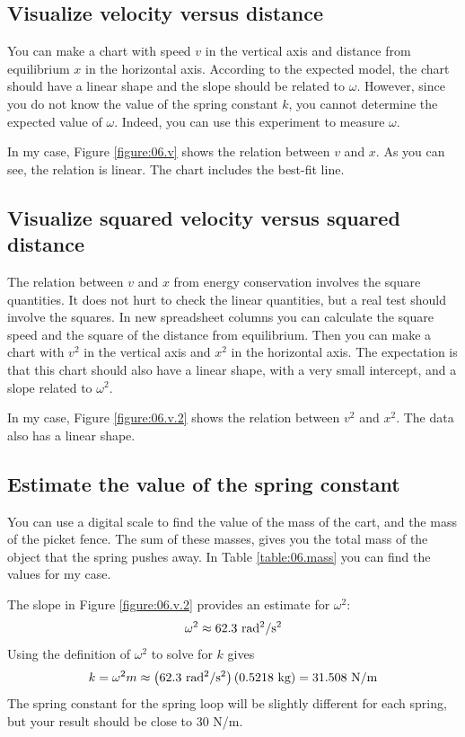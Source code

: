 \subsection{Visualize velocity versus distance}
%
You can make a chart with speed $v$ in the vertical axis and distance from equilibrium $x$ in the horizontal axis. According to the expected model, the chart should have a linear shape and the slope should be related to $\omega$. However, since you do not know the value of the spring constant $k$, you cannot determine the expected value of $\omega$. Indeed, you can use this experiment to measure $\omega$.

In my case, Figure \ref{figure:06.v} shows the relation between $v$ and $x$. As you can see, the relation is linear. The chart includes the best-fit line.
%
\subsection{Visualize squared velocity versus squared distance}
%
The relation between $v$ and $x$ from energy conservation involves the square quantities. It does not hurt to check the linear quantities, but a real test should involve the squares. In new spreadsheet columns you can calculate the square speed and the square of the distance from equilibrium. Then you can make a chart with $v^{2}$ in the vertical axis and $x^{2}$ in the horizontal axis. The expectation is that this chart should also have a linear shape, with a very small intercept, and a slope related to $\omega^{2}$.

In my case, Figure \ref{figure:06.v.2} shows the relation between $v^{2}$ and $x^{2}$. The data also has a linear shape.
%
\subsection{Estimate the value of the spring constant}
%
You can use a digital scale to find the value of the mass of the cart, and the mass of the picket fence. The sum of these masses, gives you the total mass of the object that the spring pushes away. In Table \ref{table:06.mass} you can find the values for my case.

The slope in Figure \ref{figure:06.v.2} provides an estimate for $\omega^{2}$:
\begin{equation}
    \omega^{2} \approx 62.3 \ \text{rad\textsuperscript{2}/s\textsuperscript{2}}
\end{equation}
Using the definition of $\omega^{2}$ to solve for $k$ gives
\begin{equation}
    k = \omega^{2} m \approx \left( 62.3 \ \text{rad\textsuperscript{2}/s\textsuperscript{2}} \right) \left( 0.5218 \ \text{kg} \right) = 31.508 \ \text{N/m}
\end{equation}
The spring constant for the spring loop will be slightly different for each spring, but your result should be close to 30 N/m.
%
